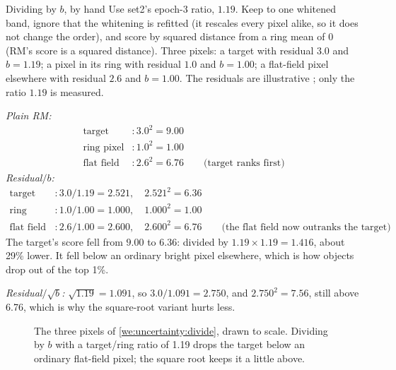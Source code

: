 \begin{worked}[label={we:uncertainty:divide}]{Dividing by $b$, by hand}
Use set2's epoch-3 ratio, $1.19$. Keep to one whitened band, ignore that the whitening is refitted (it rescales
every pixel alike, so it does not change the order), and score by squared distance from a ring mean of $0$
(RM's score is a squared distance). Three pixels: a target with residual $3.0$ and $b=1.19$; a pixel in its ring
with residual $1.0$ and $b=1.00$; a flat-field pixel elsewhere with residual $2.6$ and $b=1.00$. The residuals
are illustrative \tagA; only the ratio $1.19$ is measured.

\emph{Plain RM:}
\begin{align*}
\text{target} &: 3.0^2 = 9.00\\
\text{ring pixel} &: 1.0^2 = 1.00\\
\text{flat field} &: 2.6^2 = 6.76 \qquad\text{(target ranks first)}
\end{align*}
\emph{Residual$/b$:}
\begin{align*}
\text{target} &: 3.0/1.19 = 2.521,\quad 2.521^2 = 6.36\\
\text{ring pixel} &: 1.0/1.00 = 1.000,\quad 1.000^2 = 1.00\\
\text{flat field} &: 2.6/1.00 = 2.600,\quad 2.600^2 = 6.76 \qquad\text{(the flat field now outranks the target)}
\end{align*}
The target's score fell from $9.00$ to $6.36$: divided by $1.19\times1.19=1.416$, about 29\% lower. It fell
below an ordinary bright pixel elsewhere, which is how objects drop out of the top 1\%.

\emph{Residual$/\sqrt b$:} $\sqrt{1.19}=1.091$, so $3.0/1.091=2.750$, and $2.750^2=7.56$, still above 6.76,
which is why the square-root variant hurts less.
\end{worked}

\begin{figure}[htbp]
\centering
{}
\caption{The three pixels of \cref{we:uncertainty:divide}, drawn to scale. Dividing by $b$ with a target/ring
ratio of 1.19 drops the target below an ordinary flat-field pixel; the square root keeps it a little above.}
\label{fig:uncertainty:divide}
\end{figure}

